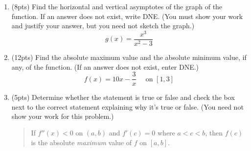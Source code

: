 \documentclass[fleqn,12pt]{article}
\newcommand{\<}{\ensuremath{\langle}}
\renewcommand{\>}{\ensuremath{\rangle}}
\begin{document}
\newpage
\begin{enumerate}
\item %
(8pts)
Find the horizontal and vertical asymptotes of the graph of the function. 
If an answer does not exist, write DNE.  
(You must show your work and justify your answer,
but you need not sketch the graph.) 
\[
g(x) = \frac{x^3}{x^2-3}
\]
\vskip3cm

\newcommand\probskip{\vskip1cm}

\probskip

\item %
(12pts)
Find the absolute maximum value and the absolute minimum value, if any, of the
function. (If an answer does not exist, enter DNE.)
\[
f(x) = 10x - \frac{3}{x} \quad \text{ on $[1,3]$}
\]
\vfill
{}


\newpage

\item %
(5pts) 
Determine whether the statement is true or false and check the
  box next to the correct statement explaining why it's true or false.  (You
  need not show your work for this problem.)

  \begin{quote}
  If $f''(x) < 0$ on $(a, b)$ and $f'(c) = 0$ where $a < c < b$, then $f(c)$ 
  is the absolute \emph{maximum} value of $f$ on $[a, b]$.
  \end{quote}


\end{enumerate}
\end{document}
